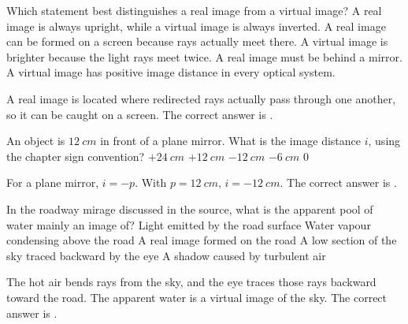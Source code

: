 \documentclass[full,print,11pt,a4paper]{physicsquiz}
\begin{document}
\begin{quizbank}
  \begin{quizquestion}[
    id=optics-images-001,
    topic=images,
    difficulty=foundation,
    marks=1,
    correct=B,
    tags={real-image,virtual-image},
    outcome={Distinguish real and virtual images}
  ]
    Which statement best distinguishes a real image from a virtual image?
    \choices
      {A real image is always upright, while a virtual image is always inverted.}
      {A real image can be formed on a screen because rays actually meet there.}
      {A virtual image is brighter because the light rays meet twice.}
      {A real image must be behind a mirror.}
      {A virtual image has positive image distance in every optical system.}
  \end{quizquestion}
  \begin{quizsolution}
    A real image is located where redirected rays actually pass through one
    another, so it can be caught on a screen. The correct answer is
    \quizcorrectletter.
  \end{quizsolution}

  \begin{quizquestion}[
    id=optics-plane-002,
    topic=plane-mirrors,
    difficulty=foundation,
    marks=1,
    correct=C,
    tags={plane-mirror,signs},
    outcome={Apply the plane mirror image-distance relation}
  ]
    An object is \(\SI{12}{cm}\) in front of a plane mirror. What is the image
    distance \(i\), using the chapter sign convention?
    \choices
      {\(+\SI{24}{cm}\)}
      {\(+\SI{12}{cm}\)}
      {\(-\SI{12}{cm}\)}
      {\(-\SI{6}{cm}\)}
      {\(0\)}
  \end{quizquestion}
  \begin{quizsolution}
    For a plane mirror, \(i=-p\). With \(p=\SI{12}{cm}\),
    \(i=-\SI{12}{cm}\). The correct answer is \quizcorrectletter.
  \end{quizsolution}

  \begin{quizquestion}[
    id=optics-mirage-003,
    topic=plane-mirrors,
    difficulty=foundation,
    marks=1,
    correct=D,
    tags={mirage,virtual-image},
    outcome={Explain why a roadway mirage is a virtual image}
  ]
    In the roadway mirage discussed in the source, what is the apparent pool of
    water mainly an image of?
    \choices
      {Light emitted by the road surface}
      {Water vapour condensing above the road}
      {A real image formed on the road}
      {A low section of the sky traced backward by the eye}
      {A shadow caused by turbulent air}
  \end{quizquestion}
  \begin{quizsolution}
    The hot air bends rays from the sky, and the eye traces those rays backward
    toward the road. The apparent water is a virtual image of the sky. The
    correct answer is \quizcorrectletter.
  \end{quizsolution}


\end{quizbank}
\end{document}
